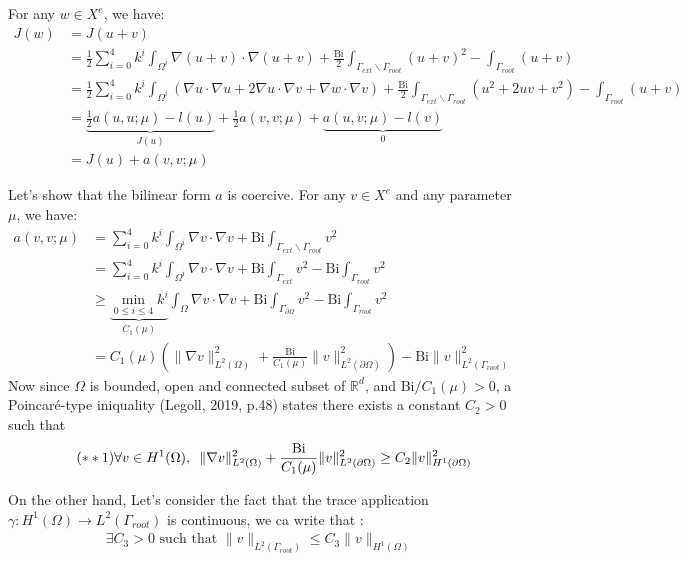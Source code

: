 \documentclass[
	english,
	11pt, %
]{fphw}
\newcommand{\hquad}{\hspace{0.5em}} %
\newcommand{\bi}{\text{Bi}}
\begin{document}
\noindent For any $w \in X^e$, we have:
\begin{align*}	
J(w) &= J(u+v) \\
&= \frac{1}{2} \sum_{i=0}^4 k^i \int_{\Omega^i} \nabla (u+v) \cdot \nabla (u+v) + \frac{\bi}{2} \int_{\Gamma_{ext} \backslash \Gamma_{root}} (u+v)^2 -\int_{\Gamma_{root}} (u+v) \\ 
&= \frac{1}{2} \sum_{i=0}^4 k^i \int_{\Omega^i} \left( \nabla u \cdot \nabla u + 2 \nabla u \cdot \nabla v + \nabla w \cdot \nabla v\right) + \frac{\bi}{2} \int_{\Gamma_{ext} \backslash \Gamma_{root}} \left( u^2 +2uv+v^2 \right) -\int_{\Gamma_{root}} \left(u + v\right) \\
&= \underbrace{\frac{1}{2}a(u,u; \mu) - l(u)}_{J(u)} + \frac{1}{2}a(v,v;\mu) + \underbrace{a(u,v;\mu)- l(v)}_{0} \\
&= J(u) + a(v,v;\mu) \tag{$\ast$} \label{j}
\end{align*}

Let's show that the bilinear form $a$ is coercive. For any $v \in X^e$ and any parameter $\mu$, we have:
\begin{align*}
	a(v,v;\mu) &= \sum_{i=0}^4 k^i \int_{\Omega^i} \nabla v \cdot \nabla v + \bi \int_{\Gamma_{ext} \backslash \Gamma_{root}} v^2 \\
	&= \sum_{i=0}^4 k^i \int_{\Omega^i} \nabla v \cdot \nabla v + \bi \int_{\Gamma_{ext}} v^2 - \bi \int_{\Gamma_{root}} v^2 \\
	&\geq \underbrace{\min_{0\leq i \leq 4} k^i}_{C_1(\mu)} \int_{\Omega} \nabla v \cdot \nabla v + \bi \int_{\Gamma_{\partial \Omega}} v^2 - \bi \int_{\Gamma_{root}} v^2 \\
	&= C_1(\mu) \left( \lVert \nabla v \rVert_{L^2(\Omega)}^2 +  \frac{\bi}{C_1(\mu)} \lVert v \rVert_{L^2(\partial \Omega)}^2  \right) - \bi \lVert v \rVert_{L^2(\Gamma_{root})}^2 \tag{$\ast \ast$} \label{coercivity}
\end{align*}
Now since $\Omega$ is bounded, open and connected subset of $\mathbb{R}^d$, and $\bi / C_1(\mu) > 0$, a Poincaré-type iniquality (Legoll, 2019, p.48) states there exists a constant $C_2 > 0$ such that 
\begin{align*} \tag{$\ast \ast 1$} \label{poincare}
\forall v \in H^1(\Omega), \hquad \lVert \nabla v \rVert_{L^2(\Omega)}^2 +  \frac{\bi}{C_1(\mu)} \lVert v \rVert_{L^2(\partial \Omega)}^2 \geq C_2 \lVert v \rVert_{H^1(\partial \Omega)}^2
\end{align*} 

\noindent On the other hand, Let's consider the fact that the trace application $\gamma : H^1(\Omega) \rightarrow L^2(\Gamma_{root})$ is continuous, we ca write that :
\begin{align*} \tag{$\ast \ast 2$} \label{trace}
\exists C_3 > 0 \text{ such that }  \lVert v \rVert_{L^2(\Gamma_{root})} \leq C_3 \lVert v \rVert_{H^1(\Omega)}
\end{align*}
\end{document}
